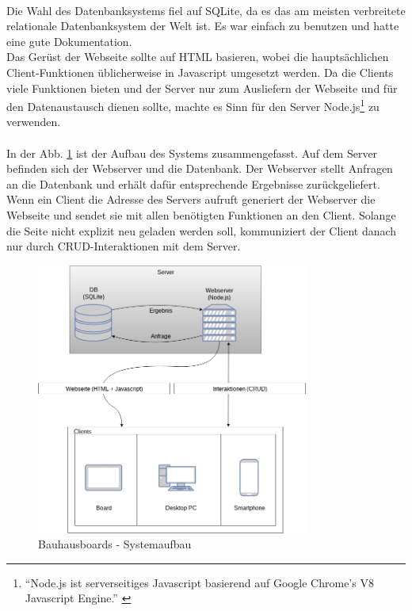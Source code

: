 \\
Die Wahl des Datenbanksystems fiel auf SQLite, da es das am meisten verbreitete relationale Datenbanksystem der Welt ist. Es war einfach zu benutzen und hatte eine gute Dokumentation.
\\
Das Gerüst der Webseite sollte auf HTML basieren, wobei die hauptsächlichen Client-Funktionen üblicherweise in Javascript umgesetzt werden. Da die Clients viele Funktionen bieten und der Server nur zum Ausliefern der Webseite und für den Datenaustausch dienen sollte, machte es Sinn für den Server Node.js\footnote{``Node.js ist serverseitiges Javascript basierend auf Google Chrome's V8 Javascript Engine.'' \cite{nodejs:website}} zu verwenden.
\\
\\
In der Abb. \ref{img:Systemaufbau} ist der Aufbau des Systems zusammengefasst. Auf dem Server befinden sich der Webserver und die Datenbank. Der Webserver stellt Anfragen an die Datenbank und erhält dafür entsprechende Ergebnisse zurückgeliefert.
\\
Wenn ein Client die Adresse des Servers aufruft generiert der Webserver die Webseite und sendet sie mit allen benötigten Funktionen an den Client. Solange die Seite nicht explizit neu geladen werden soll, kommuniziert der Client danach nur durch CRUD-Interaktionen mit dem Server.
\\
\begin{figure}[h!]
  \centering
    \includegraphics[width=0.8\textwidth]{./img/Systemaufbau.png}
  \caption{Bauhausboards - Systemaufbau}
  \label{img:Systemaufbau}
\end{figure}
